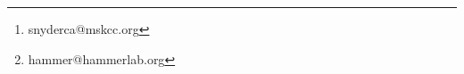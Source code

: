 
\author[addressref={aff1}]{Timothy O'Donnell}
\author[addressref={aff2}]{Elizabeth L. Christie}
\author[addressref={aff1}]{Arun Ahuja}
\author[addressref={aff1}]{Jacqueline Buros}
\author[addressref={aff1}]{B. Arman Aksoy}
\author[addressref={aff2}]{David D. L. Bowtell}
\author[addressref={aff3}]{Alexandra Snyder\thanks{snyderca@mskcc.org}}
\author[addressref={aff1}]{Jeff Hammerbacher\thanks{hammer@hammerlab.org}}

\address[id=aff1]{Mount Sinai School of Medicine, New York, USA}
\address[id=aff2]{Peter MacCallum Cancer Centre, East Melbourne, Victoria 3002, Australia}
\address[id=aff3]{Deptartment of Medicine, Memorial Sloan-Kettering Cancer Center, Weill Cornell Medical College, New York, USA}